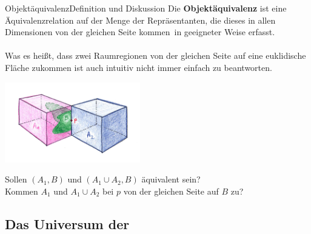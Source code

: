 \documentclass[10pt,xcolor={dvipsnames}]{beamer}
\begin{document}
\begin{frame}{Objektäquivalenz}{Definition und Diskussion}
    Die \textbf{Objektäquivalenz} ist eine Äquivalenzrelation auf der Menge der Repräsentanten, die dieses \glqq in allen Dimensionen von der gleichen Seite kommen\grqq\ in geeigneter Weise erfasst.
    \\ \ \\
    Was es heißt, dass zwei Raumregionen von der gleichen Seite auf eine euklidische Fläche zukommen ist auch intuitiv nicht immer einfach zu beantworten.\\
    \parbox{0.5\textwidth}{\includegraphics[height=3.5cm]{img/objektaeq_transparent.png}}
    \hfill\mbox{}\hfill
    \parbox{0.4\textwidth}{
        Sollen $( A_1 , B )$ und $( A_1 \cup A_2 , B )$ äquivalent sein?\\
        Kommen $A_1$ und $A_1 \cup A_2$ bei $p$ von der gleichen Seite auf $B$ zu?
    }
    \hfill\mbox{}\hfill
\end{frame}


\subsection{Das Universum der \strukt}
\end{document}
